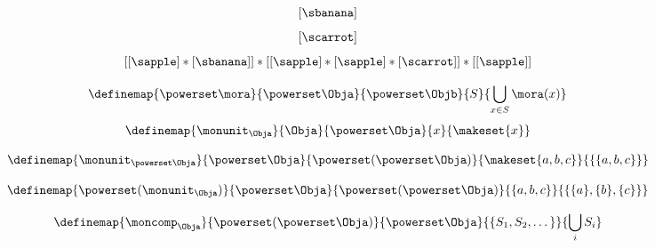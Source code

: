 {\begin{forslides}
\begin{equation}
            [ \sapple ]
        \end{equation}
        \begin{equation}
            \label{eq:fruit-sum-17}
            [ \sbanana ]
        \end{equation}
        \begin{equation}
            \label{eq:fruit-sum-18}
            [ \scarrot ]
        \end{equation}
        \begin{equation}
            \label{eq:fruit-sum-20}
            [ [ \sapple ]   * [ \sbanana] ] *  [[ \sapple ]   *  [ \sapple ] *  [\scarrot ] ]   *  [[ \sapple ] ]
        \end{equation}

\begin{equation}
    \label{eq:monad-power-functor}
    \definemap{
        \powerset \mora
    }{
        \powerset \Obja
    }{
        \powerset \Objb
    }{
        S
    }{
        \bigcup_{x\in S} \mora(x)
    }
\end{equation}
%
\begin{equation}
    \label{eq:monad-power-monunit}
    \definemap{
        \monunit_\Obja
    }{
        \Obja
    }{
        \powerset\Obja
    }{
        x
    }{
        \makeset{ x }
    }
\end{equation}

\begin{equation}
    \label{eq:monad-power-monunit-power}
    \definemap{
        \monunit_{\powerset \Obja}
    }{
        \powerset \Obja
    }{
        \powerset (\powerset\Obja)
    }{
        \makeset{a, b, c}
    }{
        \{ \{a, b, c \} \}
    }
\end{equation}

\begin{equation}
    \label{eq:monad-power-power-monunit}
    \definemap{
        \powerset(\monunit_\Obja)
    }{
        \powerset \Obja
    }{
        \powerset (\powerset\Obja)
    }{
        \{a, b, c\}
    }{
        \{ \{a\}, \{ b\}, \{c\} \}
    }
\end{equation}

\begin{equation}
    \label{eq:monad-power-moncomp}
    \definemap{
        \moncomp_{\Obja}
    }{
        \powerset (\powerset\Obja)
    }{
        \powerset \Obja
    }{
        \{S_1, S_2, \dots \}
    }{
        \bigcup_i S_i
    }
\end{equation}


\end{forslides}}

